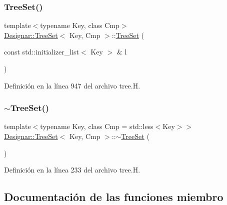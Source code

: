 \subsubsection{\texorpdfstring{Tree\+Set()}{TreeSet()}\hspace{0.1cm}{\footnotesize\ttfamily [7/7]}}
{\footnotesize\ttfamily template$<$typename Key, class Cmp$>$ \\
\hyperlink{class_designar_1_1_tree_set}{Designar\+::\+Tree\+Set}$<$ Key, Cmp $>$\+::\hyperlink{class_designar_1_1_tree_set}{Tree\+Set} (\begin{DoxyParamCaption}\item[{const std\+::initializer\+\_\+list$<$ Key $>$ \&}]{l }\end{DoxyParamCaption})}



Definición en la línea 947 del archivo tree.\+H.

\mbox{\label{class_designar_1_1_tree_set_af1c4be1e69a6bcaab42f81668df410d5}} 
\subsubsection{\texorpdfstring{$\sim$\+Tree\+Set()}{~TreeSet()}}
{\footnotesize\ttfamily template$<$typename Key, class Cmp = std\+::less$<$\+Key$>$$>$ \\
\hyperlink{class_designar_1_1_tree_set}{Designar\+::\+Tree\+Set}$<$ Key, Cmp $>$\+::$\sim$\hyperlink{class_designar_1_1_tree_set}{Tree\+Set} (\begin{DoxyParamCaption}{ }\end{DoxyParamCaption})\hspace{0.3cm}{\ttfamily [inline]}}



Definición en la línea 233 del archivo tree.\+H.



\subsection{Documentación de las funciones miembro}
\mbox{\label{class_designar_1_1_tree_set_a81abff4df0c9baf2fbf5c96a2d72cb67}} 

